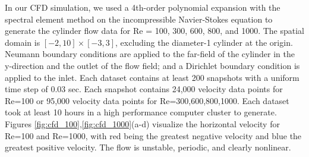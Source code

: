 \documentclass[letterpaper,12pt,peerreviewca,draftcls]{IEEEtran}
\begin{document}
In our CFD simulation, we used a 4th-order polynomial expansion with the spectral element method on the incompressible Navier-Stokes equation to generate the cylinder flow data for Re = 100, 300, 600, 800, and 1000. The spatial domain is $\left[-2,10\right]\times\left[-3,3\right]$, excluding the diameter-1 cylinder at the origin.  Neumann boundary conditions are applied to the far-field of the cylinder in the y-direction and the outlet of the flow field; and a Dirichlet boundary condition is applied to the inlet. Each dataset contains at least 200 snapshots with a uniform time step of 0.03 sec. Each snapshot contains 24,000 velocity data points for Re=100 or 95,000 velocity data points for Re=300,600,800,1000. Each dataset took at least 10 hours in a high performance computer cluster to generate. Figures \ref{fig:cfd_100},\ref{fig:cfd_1000}(a-d) visualize the horizontal velocity for Re=100 and Re=1000, with red being the greatest negative velocity and blue the greatest positive velocity. The flow is unstable, periodic, and clearly nonlinear.
\end{document}
